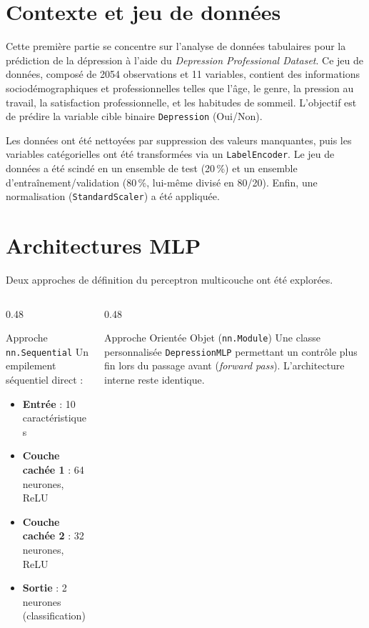 
\section{Contexte et jeu de données}

Cette première partie se concentre sur l'analyse de données tabulaires pour la prédiction de la dépression à l'aide du \emph{Depression Professional Dataset}. Ce jeu de données, composé de 2054 observations et 11 variables, contient des informations sociodémographiques et professionnelles telles que l'âge, le genre, la pression au travail, la satisfaction professionnelle, et les habitudes de sommeil. L'objectif est de prédire la variable cible binaire \texttt{Depression} (Oui/Non).

Les données ont été nettoyées par suppression des valeurs manquantes, puis les variables catégorielles ont été transformées via un \texttt{LabelEncoder}. Le jeu de données a été scindé en un ensemble de test (20\,\%) et un ensemble d'entraînement/validation (80\,\%, lui-même divisé en 80/20). Enfin, une normalisation (\texttt{StandardScaler}) a été appliquée.

\section{Architectures MLP}

Deux approches de définition du perceptron multicouche ont été explorées.

\begin{columns}
\begin{column}{0.48\textwidth}
\begin{block}{Approche \texttt{nn.Sequential}}
Un empilement séquentiel direct :
\begin{itemize}
    \item \textbf{Entrée} : 10 caractéristiques
    \item \textbf{Couche cachée 1} : 64 neurones, ReLU
    \item \textbf{Couche cachée 2} : 32 neurones, ReLU
    \item \textbf{Sortie} : 2 neurones (classification)
\end{itemize}
\end{block}
\end{column}
\begin{column}{0.48\textwidth}
\begin{block}{Approche Orientée Objet (\texttt{nn.Module})}
Une classe personnalisée \texttt{DepressionMLP} permettant un contrôle plus fin lors du passage avant (\emph{forward pass}). L'architecture interne reste identique.
\end{block}
\end{column}
\end{columns}

